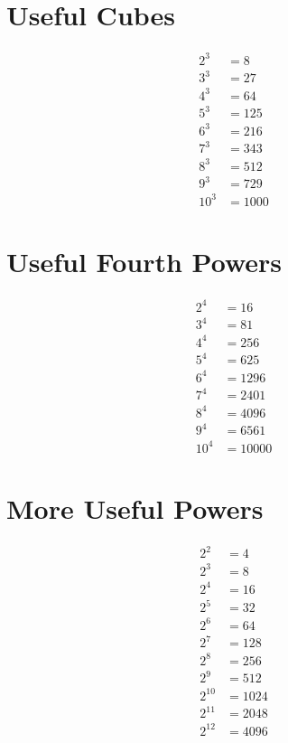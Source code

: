 \documentclass[12pt]{article}
\begin{document}
\newpage
\section*{Useful Cubes}
\begin{align*}
2^3  & = 8\\
3^3  & = 27\\
4^3  & = 64\\
5^3  & = 125\\
6^3  & = 216\\
7^3  & = 343\\
8^3  & = 512\\
9^3  & = 729\\
10^3 & = 1000
\end{align*}

\section*{Useful Fourth Powers}
\begin{align*}
2^4  & = 16\\
3^4  & = 81\\
4^4  & = 256\\
5^4  & = 625\\
6^4  & = 1296\\
7^4  & = 2401\\
8^4  & = 4096\\
9^4  & = 6561\\
10^4 & = 10000
\end{align*}

\section*{More Useful Powers}
\begin{align*}
2^2    & = 4\\
2^3    & = 8\\
2^4    & = 16\\
2^5    & = 32\\
2^6    & = 64\\
2^7    & = 128\\
2^8    & = 256\\
2^9    & = 512\\
2^{10} & = 1024\\
2^{11} & = 2048\\
2^{12} & = 4096\\
\end{align*}


\newpage
\end{document}
